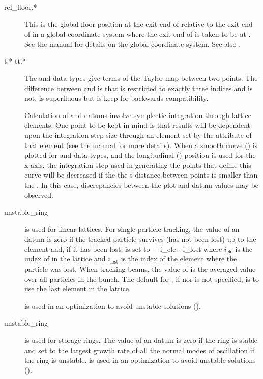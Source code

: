 \begin{description}
  \item[rel\_floor.*]
This is the global floor position at the exit end of  relative
to the exit end of  in a global coordinate system where the
exit end of  is taken to be at . See the \bmad manual for details on the global coordinate
system. See also .

  \item[t.* tt.*] \Newline
The  and  data types give terms of the Taylor map between
two points. The difference between  and  is that
 is restricted to exactly three indices and  is
not.  is superfluous but is keep for backwards compatibility.

Calculation of  and  datums involve symplectic integration
through lattice elements. One point to be kept in mind is that results
will be dependent upon the integration step size through an element
set by the  attribute of that element (see the \bmad
manual for more details). When a smooth curve () is
plotted for  and  data types, and the longitudinal
() position is used for the x-axis, the integration step used
in generating the points that define this curve will be decreased if
the the s-distance between points is smaller than the .
In this case, discrepancies between the plot and datum values may be observed.

  \item[unstable\_ring] \Newline
{} is used for linear lattices. For single particle
tracking, the value of an  datum is zero if the
tracked particle survives (has not been lost) up to the 
element and, if it has been lost, is set to 
 + i_{\mbox{ele}} - i_{\mbox{lost}}
\Endeq
where $i_{\mbox{ele}}$ is the index of  in the lattice and
$i_{\mbox{lost}}$ is the index of the element where the particle was
lost. When tracking beams, the value of  is the
averaged value over all particles in the bunch. The default for
, if  nor  is not specified, is to use
the last element in the lattice.

 is used in an optimization to avoid
unstable solutions ().

  \item[unstable\_ring] \Newline
{} is used for storage rings. The value of an
 datum is zero if the ring is stable and set to the
largest growth rate of all the normal modes of oscillation if the ring
is unstable.  is used in an optimization to avoid
unstable solutions ().


\end{description}
